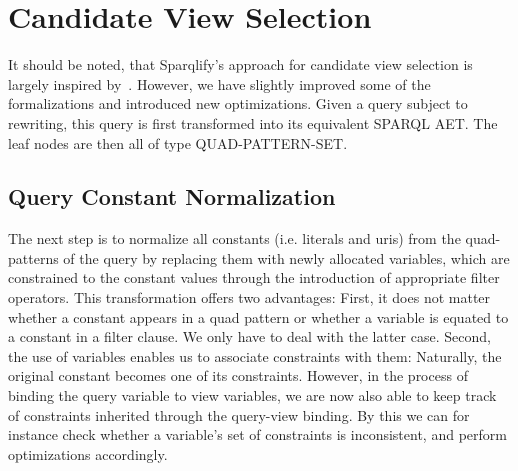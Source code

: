 \documentclass[a4paper,twoside,bibtotoc,abstracton,12pt,BCOR=15mm]{scrreprt}
\begin{document}
\section{Candidate View Selection}
It should be noted, that Sparqlify's approach for candidate view selection is largely inspired by~\cite{rewriting-queries-on-sparql-views}.
However, we have slightly improved some of the formalizations and introduced new optimizations.
Given a query subject to rewriting, this query is first transformed into its equivalent SPARQL AET.
The leaf nodes are then all of type QUAD-PATTERN-SET.

\subsection{Query Constant Normalization}
The next step is to normalize all constants (i.e. literals and uris) from the quad-patterns of the query by replacing them
with newly allocated variables, which are constrained to the constant values through the introduction of appropriate filter operators.
This transformation offers two advantages:
First, it does not matter whether a constant appears in a quad pattern or whether a variable is equated to a constant in a filter clause. We only have to deal with the latter case.
Second, the use of variables enables us to associate constraints with them: Naturally, the original constant becomes one of its constraints.
However, in the process of binding the query variable to view variables, we are now also able to keep track of constraints inherited through the query-view binding.
By this we can for instance check whether a variable's set of constraints is inconsistent, and perform optimizations accordingly.   
\end{document}
